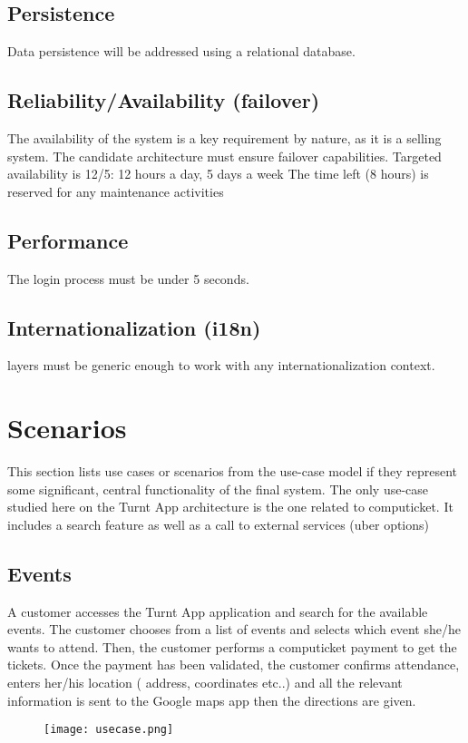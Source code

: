 \documentclass[10pt,a4paper]{article}
\begin{document}
\subsection{Persistence }

Data persistence will be addressed using a relational database. 

\subsection{Reliability/Availability (failover)}

The availability of the system is a key requirement by nature, as it is a selling system. The candidate architecture must ensure failover capabilities.
Targeted availability is 12/5: 12 hours a day, 5 days a week 
The time left (8 hours) is reserved for any maintenance activities


\subsection{Performance}

The login process must be under 5 seconds.

\subsection{Internationalization (i18n)}
layers must be generic enough to work with any internationalization context.

\section{Scenarios}
This section lists use cases or scenarios from the use-case model if they represent some significant, central functionality of the final system. The only use-case studied here on the Turnt App architecture is the one related to computicket. It includes a search feature as well as a call to external services (uber options)


\subsection{Events}
	
A customer accesses the Turnt App application and search for the available events.  The customer chooses from a list of events and selects which event she/he wants to attend.  Then, the customer performs a computicket payment to get the tickets. Once the payment has been validated, the customer confirms attendance, enters her/his location ( address, coordinates etc..) and all the relevant information is sent to the Google maps app then the directions are given.
\begin{figure}[H]
\texttt{[image: usecase.png]}
\end{figure}
\end{document}
